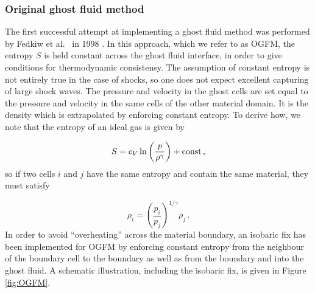 \documentclass[final,3p,twocolumn,times]{elsarticle}
\begin{document}
\subsubsection{Original ghost fluid method}
\label{subsubsec:ogfm}

The first successful attempt at implementing a ghost fluid method was performed by
Fedkiw et al.~ in 1998 \cite{fedkiw1999nonoscillatory}. In this approach, which
we refer to as OGFM, the entropy $S$ is held constant across the ghost fluid
interface, in order to give conditions for thermodynamic consistensy. The
assumption of constant entropy is not entirely true in the case of shocks, so
one does not expect excellent capturing of large shock waves. The pressure and
velocity in the ghost cells are set equal to the pressure and velocity in the
same cells of the other material domain. It is the density which is
extrapolated by enforcing constant entropy. To derive how, we note that the
entropy of an ideal gas is given by 

\begin{equation}
    \label{eq:entropy}
    S = c_V \ln \left( \frac{p}{\rho^{\gamma}} \right) + {\rm const} \,,
\end{equation}
%
so if two cells $i$ and $j$ have the same entropy and contain the same
material, they must satisfy 

\begin{equation}
    \label{eq:constEntropy}
    \rho_i = \left( \frac{p_i}{p_j} \right)^{1/\gamma} \rho_j \,.
\end{equation}
%
In order to avoid ``overheating'' across the material boundary, an isobaric fix
has been implemented for OGFM by enforcing constant entropy from the neighbour
of the boundary cell to the boundary as well as from the boundary and into
the ghost fluid. A schematic illustration, including the isobaric fix, is given
in Figure \ref{fig:OGFM}. 
\end{document}
